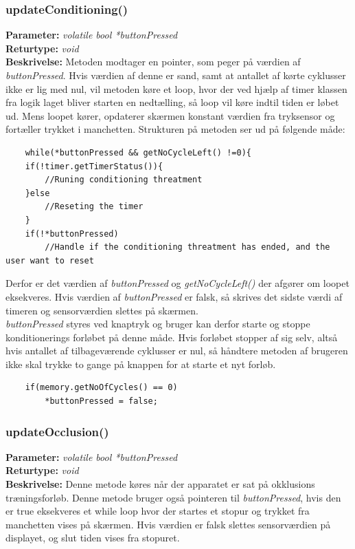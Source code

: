\subsubsection{updateConditioning()}
\textbf{Parameter: } \textit{volatile bool *buttonPressed}
\\ \textbf{Returtype: } \textit{void}
\\ \textbf{Beskrivelse: } Metoden modtager en pointer, som peger på værdien af \textit{buttonPressed}. Hvis værdien af denne er sand, samt at antallet af kørte cyklusser ikke er lig med nul, vil metoden køre et loop, hvor der ved hjælp af timer klassen fra logik laget bliver starten en nedtælling, så loop vil køre indtil tiden er løbet ud. Mens loopet kører, opdaterer skærmen konstant værdien fra tryksensor og fortæller trykket i manchetten.  Strukturen på metoden ser ud på følgende måde: 
\begin{lstlisting}
	while(*buttonPressed && getNoCycleLeft() !=0){
	if(!timer.getTimerStatus()){
		//Runing conditioning threatment 
	}else
		//Reseting the timer
	}
	if(!*buttonPressed)
		//Handle if the conditioning threatment has ended, and the user want to reset
\end{lstlisting}
Derfor er det værdien af \textit{buttonPressed} og \textit{getNoCycleLeft()} der afgører om loopet eksekveres. Hvis værdien af \textit{buttonPressed} er falsk, så skrives det sidste værdi af timeren og sensorværdien slettes på skærmen.  \\

\textit{buttonPressed} styres ved knaptryk og bruger kan derfor starte og stoppe konditionerings forløbet på denne måde. Hvis forløbet stopper af sig selv, altså hvis antallet af tilbageværende cyklusser er nul, så håndtere metoden af brugeren ikke skal trykke to gange på knappen for at starte et nyt forløb. 
\begin{lstlisting}
	if(memory.getNoOfCycles() == 0)
		*buttonPressed = false;
\end{lstlisting}

\subsubsection{updateOcclusion()}
\textbf{Parameter: } \textit{volatile bool *buttonPressed}
\\ \textbf{Returtype: } \textit{void}
\\ \textbf{Beskrivelse: } Denne metode køres når der apparatet er sat på okklusions træningsforløb. Denne metode bruger også pointeren til \textit{buttonPressed}, hvis den er true eksekveres et while loop hvor der startes et stopur og trykket fra manchetten vises på skærmen. Hvis værdien er falsk slettes sensorværdien på displayet, og slut tiden vises fra stopuret.

